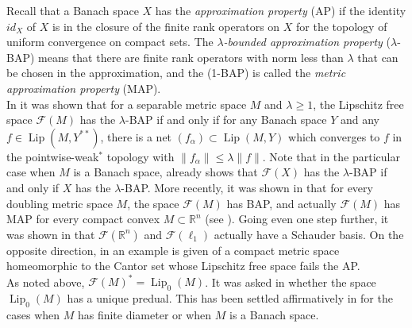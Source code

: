 \documentclass[12pt,leqno]{amsart}
\numberwithin{equation}{section} %
\theoremstyle{definition}
\numberwithin{equation}{section}
\def\Lip{\operatorname{Lip}}
\begin{document}
Recall that a Banach space $X$ has the \textit{approximation property} (AP) if the identity $id_X$ of $X$ is in the closure of the finite rank operators on $X$ for the topology of uniform convergence on compact sets. The \textit{$\lambda$-bounded approximation property} ($\lambda$-BAP) means that there are finite rank operators with norm less than $\lambda$ that can be chosen in the approximation, and the (1-BAP) is called the \textit{metric approximation property} (MAP).\\

In \cite{GO} it was shown that for a separable metric space  $M$ and $\lambda\geq1$, the Lipschitz free space $\mathcal F(M)$ has the $\lambda$-BAP if and only if for any Banach space $Y$ and any $f\in \Lip(M,Y^{**})$, there is a net $(f_\alpha)\subset \Lip(M,Y)$ which converges to $f$ in the pointwise-weak$^*$ topology with $\|f_\alpha\|\leq\lambda\|f\|$. Note that in the particular case when $M$ is a Banach space, \cite[Theorem 5.3]{GK} already shows that $\mathcal F(X)$ has the $\lambda$-BAP if and only if $X$ has the $\lambda$-BAP. More recently, it was shown in \cite{LP} that for every doubling metric space $M$, the space $\mathcal F(M)$ has BAP, and actually $\mathcal F(M)$ has MAP for every compact convex $M\subset \mathbb R^n$ (see \cite{PS}). Going even one step further, it was shown in \cite{HP} that $\mathcal F(\mathbb R^n)$ and $\mathcal F(\ell_1)$ actually have a Schauder basis. On the opposite direction, in \cite{HLP} an example is given of a compact metric space homeomorphic to the Cantor set whose Lipschitz free space fails the AP.\\

As noted above,  $\mathcal F(M)^* = \Lip_0(M)$. It was asked in \cite{Weaver} whether the space $\Lip_0(M)$ has a unique predual. This has been settled affirmatively in \cite{Weaver18} for the cases when $M$ has finite diameter or when $M$ is a Banach space.\\
\end{document}
